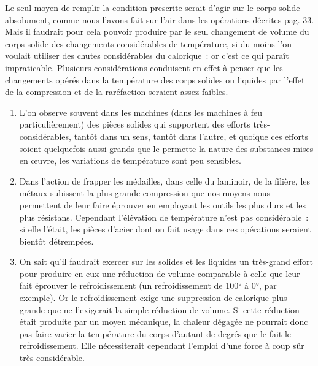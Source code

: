 \documentclass[french,twoside]{book} %
\begin{document}
Le seul moyen de remplir la condition prescrite serait d’agir sur le corps solide absolument, comme nous l’avons fait sur l’air dans les opérations décrites pag. 33. Mais il faudrait pour cela pouvoir produire par le seul changement de volume du corps solide des changements considérables de température, si du moins l’on voulait utiliser des chutes considérables du calorique : or c’est ce qui paraît impraticable. Plusieurs considérations conduisent en effet à penser que les changements opérés dans la température des corps solides ou liquides par l’effet de la compression et de la raréfaction seraient assez faibles.\par

\begin{enumerate}[itemsep=0pt,topsep=0pt,partopsep=0pt,parskip=0pt]
\item L’on observe souvent dans les machines (dans les machines à feu particulièrement) des pièces solides qui supportent des efforts très-considérables, tantôt dans un sens, tantôt dans l’autre, et quoique ces efforts soient quelquefois aussi grands que le permette la nature des substances mises en œuvre, les variations de température sont peu sensibles.
\item Dans l’action de frapper les médailles, dans celle du laminoir, de la filière, les métaux subissent la plus grande compression que nos moyens nous permettent de leur faire éprouver en employant les outils les plus durs et les plus résistans. Cependant l’élévation de température n’est pas considérable : si elle l’était, les pièces d’acier dont on fait usage dans ces opérations seraient bientôt détrempées.
\item On sait qu’il faudrait exercer sur les solides et les liquides un très-grand effort pour produire en eux une réduction de volume comparable à celle que leur fait éprouver le refroidissement (un refroidissement de 100° à 0°, par exemple). Or le refroidissement exige une suppression de calorique plus grande que ne l’exigerait la simple réduction de volume. Si cette réduction était produite par un moyen mécanique, la chaleur dégagée ne pourrait donc pas faire varier la température du corps d’autant de degrés que le fait le refroidissement. Elle nécessiterait cependant l’emploi d’une force à coup sûr très-considérable.
\end{enumerate}
\end{document}
